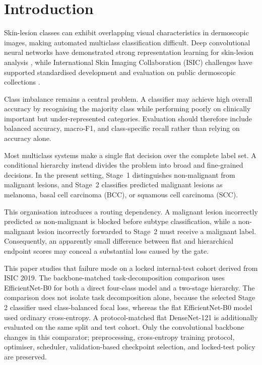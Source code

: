 \section{Introduction}
\label{sec:introduction}

Skin-lesion classes can exhibit overlapping visual characteristics in
dermoscopic images, making automated multiclass classification difficult.
Deep convolutional neural networks have demonstrated strong representation
learning for skin-lesion analysis \cite{esteva2017dermatologist}, while
International Skin Imaging Collaboration (ISIC) challenges have supported
standardised development and evaluation on public dermoscopic collections
\cite{codella2019isic2018}.

Class imbalance remains a central problem. A classifier may achieve high
overall accuracy by recognising the majority class while performing poorly on
clinically important but under-represented categories. Evaluation should
therefore include balanced accuracy, macro-F1, and class-specific recall rather
than relying on accuracy alone.

Most multiclass systems make a single flat decision over the complete label
set. A conditional hierarchy instead divides the problem into broad and
fine-grained decisions. In the present setting, Stage~1 distinguishes
non-malignant from malignant lesions, and Stage~2 classifies predicted
malignant lesions as melanoma, basal cell carcinoma (BCC), or squamous cell
carcinoma (SCC).

This organisation introduces a routing dependency. A malignant lesion
incorrectly predicted as non-malignant is blocked before subtype
classification, while a non-malignant lesion incorrectly forwarded to
Stage~2 must receive a malignant label. Consequently, an apparently small
difference between flat and hierarchical endpoint scores may conceal a
substantial loss caused by the gate.

This paper studies that failure mode on a locked internal-test cohort derived
from ISIC 2019. The backbone-matched task-decomposition comparison uses
EfficientNet-B0 \cite{tan2019efficientnet}
for both a direct four-class model and a two-stage hierarchy.
The comparison does not isolate task decomposition alone, because the selected
Stage 2 classifier used class-balanced focal loss, whereas the flat
EfficientNet-B0 model used ordinary cross-entropy. A protocol-matched flat DenseNet-121
\cite{huang2017} is additionally evaluated on the same split and test cohort.
Only the convolutional backbone changes in this comparator; preprocessing,
cross-entropy training protocol, optimiser, scheduler, validation-based
checkpoint selection, and locked-test policy are preserved.

